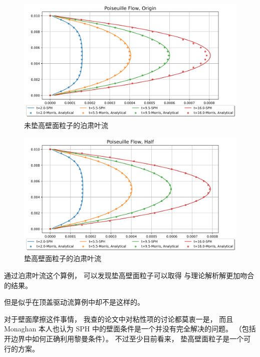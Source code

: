 \begin{frame}
    \begin{figure}[H]
        \centering
        \includegraphics[width=\textwidth]{images/Poiseuille2D/poiseuille_2d_origin.png}
        \caption{未垫高壁面粒子的泊肃叶流}
    \end{figure}
\end{frame}

\begin{frame}
    \begin{figure}[H]
        \centering
        \includegraphics[width=\textwidth]{images/Poiseuille2D/poiseuille_2d_half.png}
        \caption{垫高壁面粒子的泊肃叶流}
    \end{figure}
\end{frame}

\begin{frame}
    通过泊肃叶流这个算例，
    可以发现垫高壁面粒子可以取得
    与理论解析解更加吻合的结果。
    
    但是似乎在顶盖驱动流算例中却不是这样的。

    对于壁面摩擦这件事情，
    我查的论文中对粘性项的讨论都莫衷一是，
    而且 Monaghan 本人也认为 SPH 中的壁面条件是一个并没有完全解决的问题。
    （包括开边界中如何正确利用黎曼条件）。
    不过至少目前看来，
    垫高壁面粒子是一个可行的方案。
\end{frame}